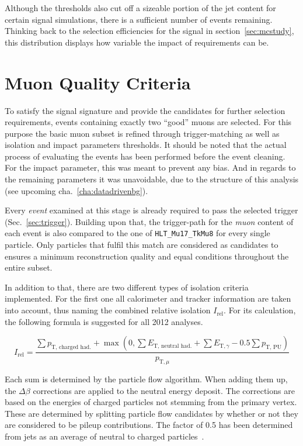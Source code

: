 \noindent Although the thresholds also cut off a sizeable portion of the jet content for certain signal simulations, there is a sufficient number of events remaining. Thinking back to the selection efficiencies for the signal in section~\ref{sec:mcstudy}, this distribution displays how variable the impact of requirements can be.
 

\section{Muon Quality Criteria}
\label{sec:muonqualy}

To satisfy the signal signature and provide the candidates for further selection requirements, events containing exactly two ``good'' muons are selected. For this purpose the basic muon subset is refined through trigger-matching as well as isolation and impact parameters thresholds. It should be noted that the actual process of evaluating the events has been performed before the event cleaning. For the impact parameter, this was meant to prevent any bias. And in regards to the remaining parameters it was unavoidable, due to the structure of this analysis (see upcoming cha.~\ref{cha:datadrivenbg}).

Every \textit{event} examined at this stage is already required to pass the selected trigger (Sec.~\ref{sec:trigger}). Building upon that, the trigger-path for the \textit{muon} content of each event is also compared to the one of \verb+HLT_Mu17_TkMu8+ for every single particle. Only particles that fulfil this match are considered as candidates to ensures a minimum reconstruction quality and equal conditions throughout the entire subset. 

In addition to that, there are two different types of isolation criteria implemented. For the first one all calorimeter and tracker information are taken into account, thus naming the combined relative isolation $I_{\text{rel}}$. For its calculation, the following formula is suggested for all 2012 analyses.

\begin{equation}
  \label{eq:reliso}
  I_{\text{rel}} = \frac{ \sum p_{\text{T, charged had.}} + \max \left( 0,  \sum E_{\text{T, neutral had.}} + \sum E_{\text{T}, \gamma} - 0.5 \sum p_{\text{T, PU}} \right) }{ p_{\text{T}, \mu} }
\end{equation}

Each sum is determined by the particle flow algorithm. When adding them up, the $\Delta \beta$ corrections are applied to the neutral energy deposit. The corrections are based on the energies of charged particles not stemming from the primary vertex. These are determined by splitting particle flow candidates by whether or not they are considered to be pileup contributions. The factor of 0.5 has been determined from jets as an average of neutral to charged particles~\cite{muondbeta}.

